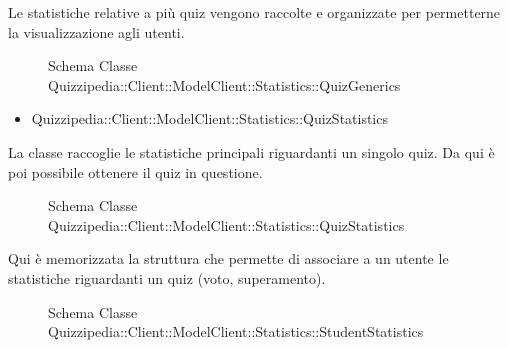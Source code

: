 Le statistiche relative a più quiz vengono raccolte e organizzate per permetterne la visualizzazione agli utenti.
\begin{figure}[H]
\centering
\noindent{}
\caption{Schema Classe Quizzipedia::Client::ModelClient::Statistics::QuizGenerics}
\end{figure}
\begin{itemize}
\item Quizzipedia::Client::ModelClient::Statistics::QuizStatistics
\end{itemize}
La classe raccoglie le statistiche principali riguardanti un singolo quiz. Da qui è poi possibile ottenere il quiz in questione.
\begin{figure}[H]
\centering
\noindent{}
\caption{Schema Classe Quizzipedia::Client::ModelClient::Statistics::QuizStatistics}
\end{figure}
Qui è memorizzata la struttura che permette di associare a un utente le statistiche riguardanti un quiz (voto, superamento).
\begin{figure}[H]
\centering
\noindent{}
\caption{Schema Classe Quizzipedia::Client::ModelClient::Statistics::StudentStatistics}
\end{figure}

